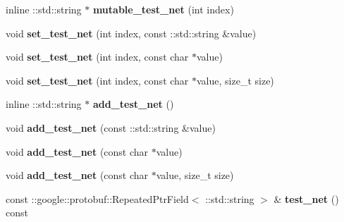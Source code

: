 \begin{DoxyCompactItemize}
\mbox{\label{classcaffe_1_1_solver_parameter_a87e0fcbfadf1f4641f633cee95ca3be0}} 
inline \+::std\+::string $\ast$ {\bfseries mutable\+\_\+test\+\_\+net} (int index)
\item 
\mbox{\label{classcaffe_1_1_solver_parameter_a1aa3590587a33bb0bbb99a1151f00b8d}} 
void {\bfseries set\+\_\+test\+\_\+net} (int index, const \+::std\+::string \&value)
\item 
\mbox{\label{classcaffe_1_1_solver_parameter_ae20bd4518717ddcc1988f3f020f6f283}} 
void {\bfseries set\+\_\+test\+\_\+net} (int index, const char $\ast$value)
\item 
\mbox{\label{classcaffe_1_1_solver_parameter_afdad8c47f93cce0a6a825707e05b937c}} 
void {\bfseries set\+\_\+test\+\_\+net} (int index, const char $\ast$value, size\+\_\+t size)
\item 
\mbox{\label{classcaffe_1_1_solver_parameter_a71eba2d8c82c8769e502265b2dd2692e}} 
inline \+::std\+::string $\ast$ {\bfseries add\+\_\+test\+\_\+net} ()
\item 
\mbox{\label{classcaffe_1_1_solver_parameter_a175c3d63f60d157a61fb1f4213c0b5a3}} 
void {\bfseries add\+\_\+test\+\_\+net} (const \+::std\+::string \&value)
\item 
\mbox{\label{classcaffe_1_1_solver_parameter_a7a4725f8ad48670dce5179ced7a8e76b}} 
void {\bfseries add\+\_\+test\+\_\+net} (const char $\ast$value)
\item 
\mbox{\label{classcaffe_1_1_solver_parameter_a3d6b70555df3bf7cec2657ca2fa1e87d}} 
void {\bfseries add\+\_\+test\+\_\+net} (const char $\ast$value, size\+\_\+t size)
\item 
\mbox{\label{classcaffe_1_1_solver_parameter_aaddb0ed70751bd5313d55d57fc3d673f}} 
const \+::google\+::protobuf\+::\+Repeated\+Ptr\+Field$<$ \+::std\+::string $>$ \& {\bfseries test\+\_\+net} () const
\item 

\end{DoxyCompactItemize}
